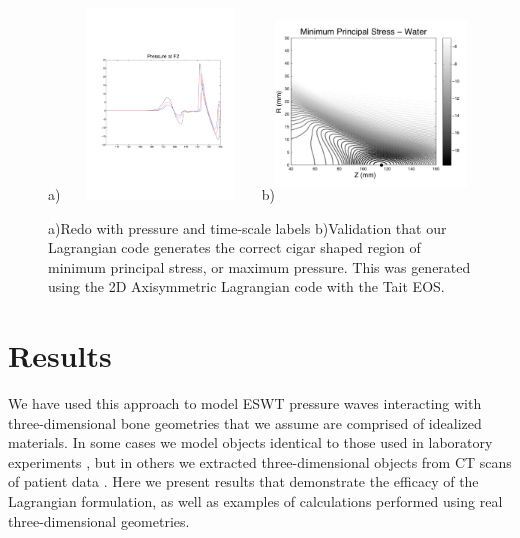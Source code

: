 \documentclass{article}
\begin{document}
\begin{figure}
\begin{center}
a) \includegraphics[height=2in,width=2in]{pressure_hm3.pdf}
b)\includegraphics[height=2in, width=2in]{minimum_pstress_water.pdf}
\label{fig:scaling}
\caption{a)Redo with pressure and time-scale labels  b)Validation that our Lagrangian code generates 
the correct cigar shaped region of minimum principal stress, or maximum pressure.  This was generated 
using the 2D Axisymmetric Lagrangian code with the Tait EOS.}
\end{center}
\end{figure}

\section{Results}
\label{sec:results}
We have used this approach to model ESWT pressure waves interacting with three-dimensional bone 
geometries that we assume are comprised of idealized materials.  In some cases we model objects 
identical to those used in laboratory experiments \cite{amath_apl_nonunion}, but in others we extracted 
three-dimensional objects from CT scans of patient data \cite{fagnan_chang_ho}.  Here we present 
results that demonstrate the efficacy of the Lagrangian formulation, as well as examples of calculations 
performed using real three-dimensional geometries. 
\end{document}
